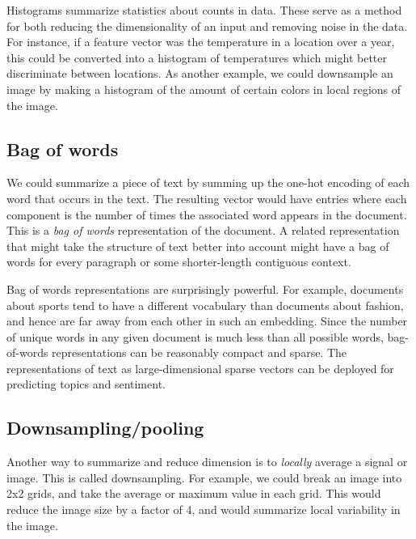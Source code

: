 \documentclass{tufte-book}
\begin{document}

Histograms summarize statistics about counts in data. These serve as a
method for both reducing the dimensionality of an input and removing
noise in the data. For instance, if a feature vector was the temperature
in a location over a year, this could be converted into a histogram of
temperatures which might better discriminate between locations. As
another example, we could downsample an image by making a histogram of
the amount of certain colors in local regions of the image.

\hypertarget{bag-of-words}{%
\subsection{Bag of words}\label{bag-of-words}}


We could summarize a piece of text by summing up the one-hot encoding of
each word that occurs in the text. The resulting vector would have
entries where each component is the number of times the associated word
appears in the document. This is a \emph{bag of words} representation of
the document. A related representation that might take the structure of
text better into account might have a bag of words for every paragraph
or some shorter-length contiguous context.

Bag of words representations are surprisingly powerful. For example,
documents about sports tend to have a different vocabulary than
documents about fashion, and hence are far away from each other in such
an embedding. Since the number of unique words in any given document is
much less than all possible words, bag-of-words representations can be
reasonably compact and sparse. The representations of text as
large-dimensional sparse vectors can be deployed for predicting topics
and sentiment.

\hypertarget{downsamplingpooling}{%
\subsection{Downsampling/pooling}\label{downsamplingpooling}}

Another way to summarize and reduce dimension is to \emph{locally}
average a signal or image. This is called downsampling. For example, we
could break an image into 2x2 grids, and take the average or maximum
value in each grid. This would reduce the image size by a factor of 4,
and would summarize local variability in the image.
\end{document}
